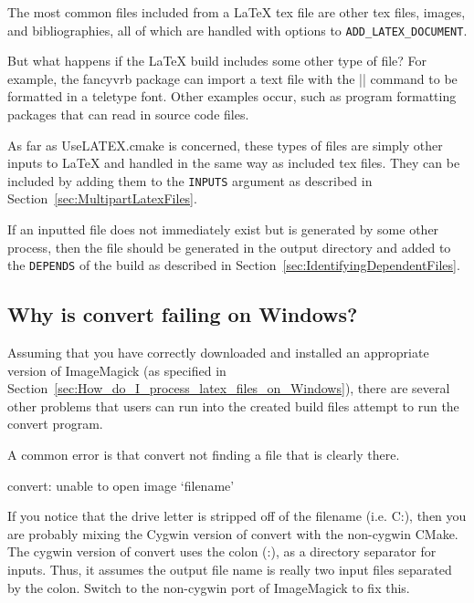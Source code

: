 \documentclass{article}
\newcommand*{\textfile}[1]{\textsf{#1}}
\newcommand*{\textprog}[1]{\textfile{#1}}
\newcommand*{\textlatexpackage}[1]{\textsf{#1}}
\newcommand*{\textcmake}[1]{\texttt{#1}}
\newcommand*{\UseLATEX}{\textfile{UseLATEX.cmake}\xspace}
\newcommand*{\latex}{\LaTeX\xspace}
\newcommand*{\ald}{\textcmake{ADD\_LATEX\_DOCUMENT}\xspace}
\begin{document}
  The most common files included from a \latex tex file are other tex
  files, images, and bibliographies, all of which are handled with options
  to \ald.

  But what happens if the \latex build includes some other type of file?
  For example, the \textlatexpackage{fancyvrb} package can import a text
  file with the \textlatex|\VerbatimInput| command to be formatted in a
  teletype font.  Other examples occur, such as program formatting packages
  that can read in source code files.

  As far as \UseLATEX is concerned, these types of files are simply other
  inputs to \latex and handled in the same way as included tex files.  They
  can be included by adding them to the \textcmake{INPUTS} argument as
  described in Section~\ref{sec:MultipartLatexFiles}.

  If an inputted file does not immediately exist but is generated by some
  other process, then the file should be generated in the output directory
  and added to the \textcmake{DEPENDS} of the build as described in
  Section~\ref{sec:IdentifyingDependentFiles}.

  \subsection{Why is convert failing on Windows?}
  \label{sec:Why_is_convert_failing_on_Windows}

  Assuming that you have correctly downloaded and installed an appropriate
  version of ImageMagick (as specified in
  Section~\ref{sec:How_do_I_process_latex_files_on_Windows}), there are several
  other problems that users can run into the created build files attempt to
  run the \textprog{convert} program.

  A common error is that \textprog{convert} not finding a file that
  is clearly there.

  \begin{CodeListing}
convert: unable to open image `filename'
  \end{CodeListing}

  If you notice that the drive letter is stripped off of the filename
  (i.e. \textfile{C:}), then you are probably mixing the Cygwin version of
  \textprog{convert} with the non-cygwin CMake. The cygwin version of
  \textprog{convert} uses the colon (:), as a directory separator for
  inputs. Thus, it assumes the output file name is really two input files
  separated by the colon. Switch to the non-cygwin port of ImageMagick to
  fix this.
\end{document}
